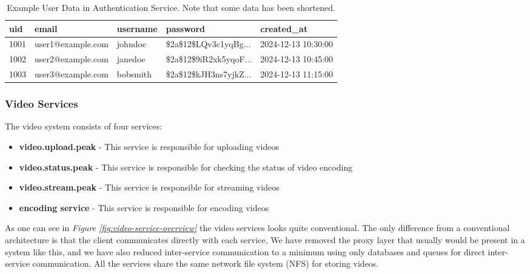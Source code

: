 \documentclass[12pt]{article}
\begin{document}
\begin{table}[h]
    \centering
    \caption{Example User Data in Authentication Service. Note that some data has been shortened.}
    \begin{tabular}{|l|l|l|p{4.5cm}|l|}
        \hline
        \textbf{uid} & \textbf{email} & \textbf{username} & \textbf{password} & \textbf{created\_at} \\
        \hline
        1001 & user1@example.com & johndoe & \$2a\$12\$LQv3c1yqBg... & 2024-12-13 10:30:00 \\
        \hline
        1002 & user2@example.com & janedoe & \$2a\$12\$9iR2xk5yqoF... & 2024-12-13 10:45:00 \\
        \hline
        1003 & user3@example.com & bobsmith & \$2a\$12\$kJH3ns7yjkZ... & 2024-12-13 11:15:00 \\
        \hline
    \end{tabular}
    \label{tab:user-data}
\end{table}

\subsubsection{Video Services}
The video system consists of four services:
\begin{itemize}
    \item \textbf{video.upload.peak} - This service is responsible for uploading videos
    \item \textbf{video.status.peak} - This service is responsible for checking the status of video encoding
    \item \textbf{video.stream.peak} - This service is responsible for streaming videos
    \item \textbf{encoding service} - This service is responsible for encoding videos
\end{itemize}

As one can see in \textit{Figure \ref{fig:video-service-overview}} the video services looks quite conventional.
The only difference from a conventional architecture is that the client communicates directly with each service,
We have removed the proxy layer that usually would be present in a system like this, and we have also reduced
inter-service communication to a minimum using only databases and queues for direct inter-service communication.
All the services share the same network file system (NFS) for storing videos.
\end{document}
